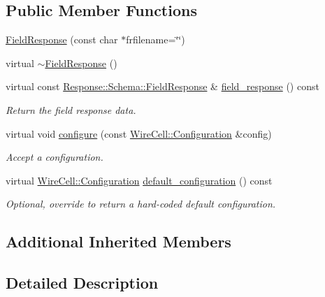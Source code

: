 \subsection*{Public Member Functions}
\begin{DoxyCompactItemize}
\item 
\hyperlink{class_wire_cell_1_1_sig_proc_1_1_field_response_add85f7169627164adefb45e3973007be}{Field\+Response} (const char $\ast$frfilename=\char`\"{}\char`\"{})
\item 
virtual \hyperlink{class_wire_cell_1_1_sig_proc_1_1_field_response_a1871a103360bc99a8eb0b3874e85cf85}{$\sim$\+Field\+Response} ()
\item 
virtual const \hyperlink{struct_wire_cell_1_1_response_1_1_schema_1_1_field_response}{Response\+::\+Schema\+::\+Field\+Response} \& \hyperlink{class_wire_cell_1_1_sig_proc_1_1_field_response_a417bd4fb3bbcae69c78ae5db0ae40f41}{field\+\_\+response} () const
\begin{DoxyCompactList}\small\item\em Return the field response data. \end{DoxyCompactList}\item 
virtual void \hyperlink{class_wire_cell_1_1_sig_proc_1_1_field_response_aebaaef66bd121652084b5eb2e68cabfa}{configure} (const \hyperlink{namespace_wire_cell_a9f705541fc1d46c608b3d32c182333ee}{Wire\+Cell\+::\+Configuration} \&config)
\begin{DoxyCompactList}\small\item\em Accept a configuration. \end{DoxyCompactList}\item 
virtual \hyperlink{namespace_wire_cell_a9f705541fc1d46c608b3d32c182333ee}{Wire\+Cell\+::\+Configuration} \hyperlink{class_wire_cell_1_1_sig_proc_1_1_field_response_a0ee90ff076a2aba11ac0598220e8bc09}{default\+\_\+configuration} () const
\begin{DoxyCompactList}\small\item\em Optional, override to return a hard-\/coded default configuration. \end{DoxyCompactList}\end{DoxyCompactItemize}
\subsection*{Additional Inherited Members}


\subsection{Detailed Description}


